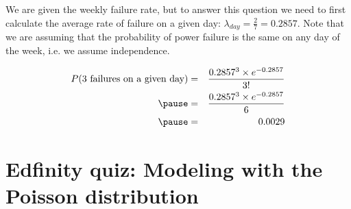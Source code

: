\documentclass[t,compress,mathserif]{beamer}
\begin{document}

\begin{frame}


\pause

We are given the weekly failure rate, but to answer this question we need to first calculate the average rate of failure on a given day: $\lambda_{day} = \frac{2}{7} = 0.2857$. Note that we are assuming that the probability of power failure is the same on any day of the week, i.e. we assume independence.

\pause

\begin{eqnarray*}
P(\text{3 failures on a given day}) &=& \frac{0.2857^3 \times e^{-0.2857}}{3!} \\
\pause
&=& \frac{0.2857^3 \times e^{-0.2857}}{6} \\
\pause
&=& 0.0029
\end{eqnarray*}

\end{frame}


\section{Edfinity quiz: Modeling with the Poisson distribution}
\end{document}
